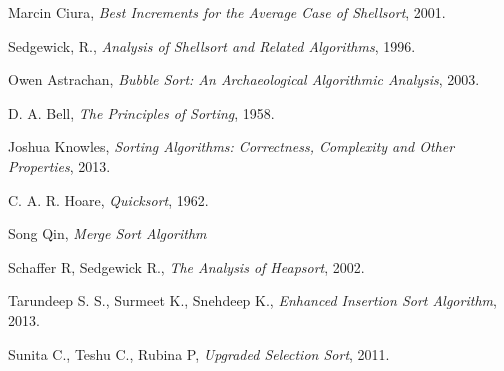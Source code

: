 \documentclass[10pt,a4paper]{article}
\begin{document}
\newpage
\pagestyle{empty} 
\renewcommand\refname{Referências}
\begin{thebibliography}{9}

	Marcin Ciura,
	\textit{Best Increments for the Average Case of Shellsort},
    2001.

	Sedgewick, R.,
	\textit{Analysis of Shellsort and Related Algorithms},
    1996.
    
	Owen Astrachan,
	\textit{Bubble Sort: An Archaeological Algorithmic Analysis},
	2003.
    
	D. A. Bell,
	\textit{The Principles of Sorting},
	1958.
    
	Joshua Knowles,
	\textit{Sorting Algorithms: Correctness, Complexity and Other Properties},
	2013.
    
	C. A. R. Hoare,
	\textit{Quicksort},
	1962.
    
	Song Qin,
	\textit{Merge Sort Algorithm }
    
	Schaffer R, Sedgewick R.,
	\textit{The Analysis of Heapsort},
	2002.
    
	Tarundeep S. S., Surmeet K., Snehdeep K.,
	\textit{Enhanced Insertion Sort Algorithm},
	2013.
    
	Sunita C., Teshu C., Rubina P,
	\textit{Upgraded Selection Sort},
	2011.
\end{thebibliography}
	
\end{document}
